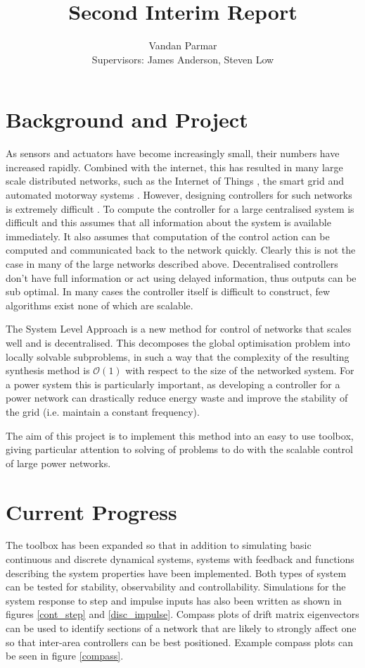 \documentclass[11pt,a4paper]{article}
\begin{document}
\title{Second Interim Report}
\author{Vandan Parmar \\
Supervisors: James Anderson, Steven Low}
\maketitle
\section*{Background and Project}
As sensors and actuators have become increasingly small, their numbers have increased rapidly. Combined with the internet, this has resulted in many large scale distributed networks, such as the Internet of Things \cite{Atzori2010}, the smart grid \cite{Amin2005,Farhangi2010} and automated motorway systems \cite{Chien1997}. However, designing controllers for such networks is extremely difficult \cite{Rotkowitz2006}. To compute the controller for a large centralised system is difficult and this assumes that all information about the system is available immediately. It also assumes that computation of the control action can be computed and communicated back to the network quickly. Clearly this is not the case in many of the large networks described above. Decentralised controllers don't have full information or act using delayed information, thus outputs can be sub optimal. In many cases the controller itself is difficult to construct, few algorithms exist none of which are scalable.

The System Level Approach \cite{Wang2016,Wang2017} is a new method for control of networks that scales well and is decentralised. This decomposes the global optimisation problem into locally solvable subproblems, in such a way that the complexity of the resulting synthesis method is $\mathcal{O}(1)$ with respect to the size of the networked system. For a power system this is particularly important, as developing a controller for a power network can drastically reduce energy waste and improve the stability of the grid (i.e. maintain a constant frequency). 

The aim of this project is to implement this method into an easy to use toolbox, giving particular attention to solving of problems to do with the scalable control of large power networks.


\section*{Current Progress}
The toolbox has been expanded so that in addition to simulating basic continuous and discrete dynamical systems, systems with feedback and functions describing the system properties have been implemented. Both types of system can be tested for stability, observability and controllability. Simulations for the system response to step and impulse inputs has also been written as shown in figures \ref{cont_step} and \ref{disc_impulse}. Compass plots of drift matrix eigenvectors can be used to identify sections of a network that are likely to strongly affect one so that inter-area controllers can be best positioned. Example compass plots can be seen in figure \ref{compass}.
\end{document}
